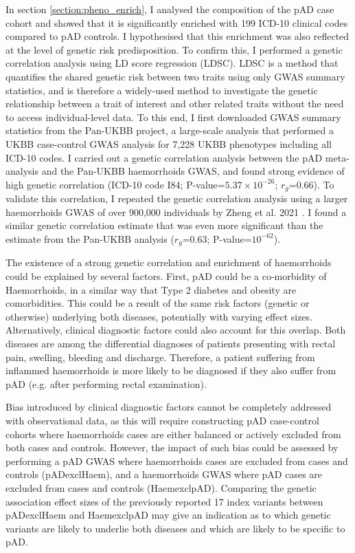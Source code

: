   In section \ref{section:pheno_enrich}, I analysed the composition of the pAD case cohort and showed that it is significantly enriched with 199 ICD-10 clinical codes compared to pAD controls. I hypothesised that this enrichment was also reflected at the level of genetic risk predisposition. To confirm this, I performed a genetic correlation analysis using LD score regression (LDSC). LDSC is a method that quantifies the shared genetic risk between two traits using only GWAS summary statistics, and is therefore a widely-used method to investigate the genetic relationship between a trait of interest and other related traits without the need to access individual-level data. To this end, I first downloaded GWAS summary statistics from the Pan-UKBB project, a large-scale analysis that performed a UKBB case-control GWAS analysis for 7,228 UKBB phenotypes including all ICD-10 codes. I carried out a genetic correlation analysis between the pAD meta-analysis and the Pan-UKBB haemorrhoids GWAS, and found strong evidence of high genetic correlation (ICD-10 code I84; P-value=$5.37\times10^{-26}$; $r_{g}$=0.66). To validate this correlation, I repeated the genetic correlation analysis using a larger haemorrhoids GWAS of over 900,000 individuals by Zheng et al. 2021 \cite{Zheng2021-ss}. I found a similar genetic correlation estimate that was even more significant than the estimate from the Pan-UKBB analysis ($r_{g}$=0.63; P-value=$10^{-62}$).
  

  The existence of a strong genetic correlation and enrichment of haemorrhoids could be explained by several factors. First, pAD could be a co-morbidity of Haemorrhoids, in a similar way that Type 2 diabetes and obesity are comorbidities. This could be a result of the same risk factors (genetic or otherwise) underlying both diseases, potentially with varying effect sizes. Alternatively, clinical diagnostic factors could also account for this overlap. Both diseases are among the differential diagnoses of patients presenting with rectal pain, swelling, bleeding and discharge. Therefore, a patient suffering from inflammed haemorrhoids is more likely to be diagnosed if they also suffer from pAD (e.g. after performing rectal examination). 

Bias introduced by clinical diagnostic factors cannot be completely addressed with observational data, as this will require constructing pAD case-control cohorts where haemorrhoids cases are either balanced or actively excluded from both cases and controls. However, the impact of such bias could be assessed by performing a pAD GWAS where haemorrhoids cases are excluded from cases and controls (pADexclHaem), and a haemorrhoids GWAS where pAD cases are excluded from cases and controls (HaemexclpAD). Comparing the genetic association effect sizes of the previously reported 17 index variants between pADexclHaem and HaemexclpAD may give an indication as to which genetic variants are likely to underlie both diseases and which are likely to be specific to pAD.

